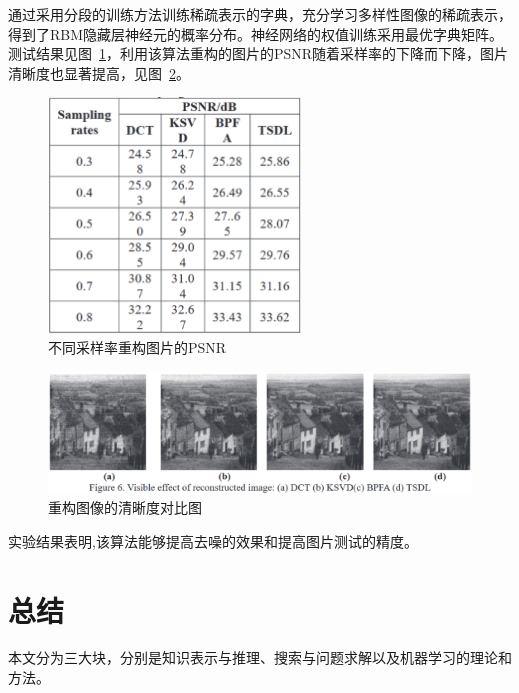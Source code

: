 \documentclass[12pt,a4paper,UTF8]{ctexart}
\begin{document}
通过采用分段的训练方法训练稀疏表示的字典，充分学习多样性图像的稀疏表示，
得到了RBM隐藏层神经元的概率分布。神经网络的权值训练采用最优字典矩阵。
测试结果见图~\ref{fig:不同采样率重构图片的PSNR}，利用该算法重构的图片的PSNR随着采样率的下降而下降，图片清晰度也显著提高，见图~\ref{fig:重构图像的清晰度对比图}。
\begin{figure}[htpb]
    \centering
    \includegraphics[width=0.6\textwidth]{allpicture/不同采样率重构图片的PSNR.eps}
    \caption{不同采样率重构图片的PSNR}
    \label{fig:不同采样率重构图片的PSNR}
\end{figure}
\begin{figure}[htpb]
    \centering
    \includegraphics[width=1\textwidth]{allpicture/重构图像的清晰度对比图.eps}
    \caption{重构图像的清晰度对比图}
    \label{fig:重构图像的清晰度对比图}
\end{figure}
实验结果表明,该算法能够提高去噪的效果和提高图片测试的精度。
\section{总结}
本文分为三大块，分别是知识表示与推理、搜索与问题求解以及机器学习的理论和方法。
\end{document}

